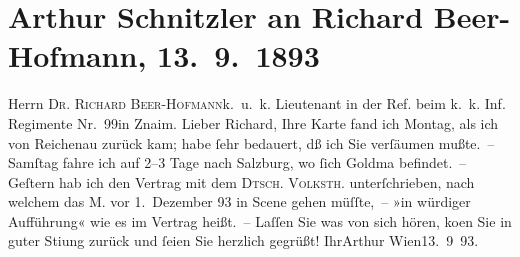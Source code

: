 

         
         \renewcommand{\erwaehntePersonen}{Personen: Richard Beer-Hofmann, Paul Goldmann}
         \renewcommand{\erwaehnteOrte}{Orte: Reichenau an der Rax, Salzburg, Volkstheater, Wien, Znaim}
         \renewcommand{\erwaehnteWerke}{Werke: Das Märchen. Schauspiel in drei Aufzügen}
               \section[Arthur Schnitzler an Richard Beer-Hofmann, 13. 9. 1893]{ Arthur Schnitzler an Richard Beer-Hofmann, 13. 9. 1893}\nopagebreak{}\rehead{ }\begin{ledgroupsized}[t]{13cm}\normalsize\beginnumbering \toendnotes[C]{\smallbreak\pagebreak[2]} 
\pstart{}{\pb}Herrn \textsc{Dr. Richard
                     Beer-Hofmann}\pend{}\pstart{}k. u. k. Lieutenant in der Ref. beim k. k. Inf. Regimente Nr. 99\pend{}\pstart{}in Znaim. \pend{}{\bigskip}\pstart{}{\pb}Lieber Richard,\pend\pstart
           Ihre Karte fand ich Montag, als ich von Reichenau zurück kam; habe ſehr bedauert, dß ich Sie verſäumen mußte. –\pend
           \pstart
           Samſtag fahre ich auf 2–3 Tage nach Salzburg, wo ſich
                  Goldma{\geminationn} be{\pb}findet. –\pend
           \pstart
           Geſtern hab ich den Vertrag mit dem \textsc{Dtsch. Volksth}. unterſchrieben, nach welchem das
                  M. vor 1. Dezember 93 in Scene
               gehen müſſte, – »in würdiger Aufführung« wie es im Vertrag heißt. –\pend
           \pstart
           {\pb}Laſſen Sie was von sich hören, ko{\geminationm}en Sie in guter Sti{\geminationm}ung
               zurück und ſeien Sie herzlich gegrüßt!\pend
           \pstart Ihr\spacefill\mbox{Arthur}\pend{}\pstart
           Wien13. 9 93.\pend
           

\end{ledgroupsized}
